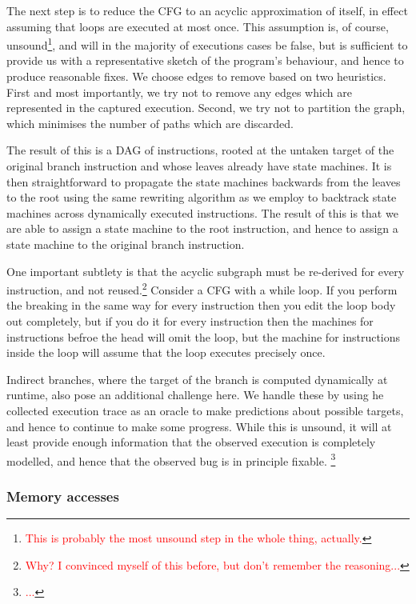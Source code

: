 \documentclass[10pt,twocolumn,preprint,natbib,authoryear]{sigplanconf}
\newcommand{\editorial}[1]{\textcolor{red}{\footnote{\textcolor{red}{#1}}}}
\begin{document}
The next step is to reduce the CFG to an acyclic approximation of
itself, in effect assuming that loops are executed at most once.  This
assumption is, of course, unsound\editorial{This is probably the most
  unsound step in the whole thing, actually.}, and will in the
majority of executions cases be false, but is sufficient to provide us
with a representative sketch of the program's behaviour, and hence to
produce reasonable fixes.  We choose edges to remove based on two
heuristics.  First and most importantly, we try not to remove any
edges which are represented in the captured execution.  Second, 
we try not to partition the graph, which minimises the number of
paths which are discarded.

The result of this is a DAG of instructions, rooted at the untaken
target of the original branch instruction and whose leaves already
have state machines.  It is then straightforward to propagate the
state machines backwards from the leaves to the root using the same
rewriting algorithm as we employ to backtrack state machines across
dynamically executed instructions.  The result of this is that we are
able to assign a state machine to the root instruction, and hence to
assign a state machine to the original branch instruction.

One important subtlety is that the acyclic subgraph must be re-derived
for every instruction, and not reused.\editorial{Why?  I convinced
  myself of this before, but don't remember the reasoning...}
Consider a CFG with a while loop.  If you perform the breaking in the
same way for every instruction then you edit the loop body out
completely, but if you do it for every instruction then the machines
for instructions befroe the head will omit the loop, but the machine
for instructions inside the loop will assume that the loop executes
precisely once.

Indirect branches, where the target of the branch is computed
dynamically at runtime, also pose an additional challenge here.  We
handle these by using he collected execution trace as an oracle to
make predictions about possible targets, and hence to continue to make
some progress.  While this is unsound, it will at least provide enough
information that the observed execution is completely modelled, and
hence that the observed bug is in principle fixable. \editorial{...}

\subsubsection{Memory accesses}
\end{document}

